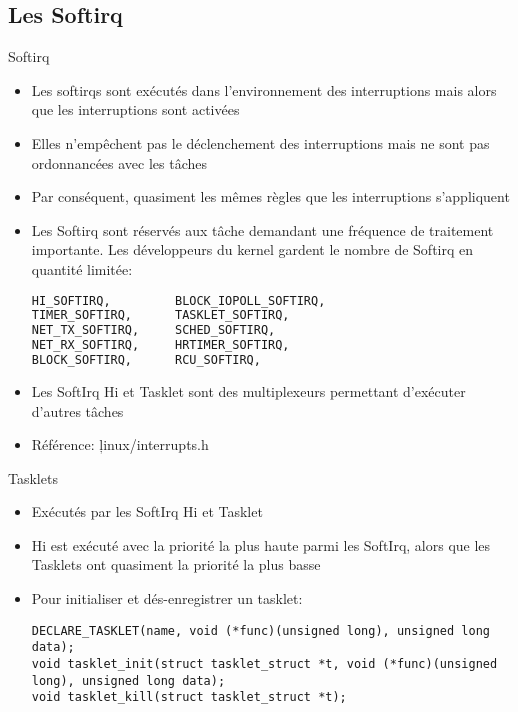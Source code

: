 \subsection{Les Softirq}

\begin{frame}[fragile=singleslide]{Softirq}
  \begin{itemize}
  \item   Les  softirqs   sont  exécutés   dans   l'environnement  des
    interruptions mais alors que les interruptions sont activées
  \item Elles  n'empêchent pas le déclenchement  des interruptions mais
    ne sont pas ordonnancées avec les tâches
  \item   Par  conséquent,   quasiment  les   mêmes  règles   que  les
    interruptions s'appliquent
  \item Les Softirq sont réservés aux tâche demandant une fréquence de
    traitement  importante.  Les  développeurs  du kernel  gardent  le
    nombre de Softirq en quantité limitée:
    \begin{lstlisting}[language=sh]
HI_SOFTIRQ,         BLOCK_IOPOLL_SOFTIRQ,
TIMER_SOFTIRQ,      TASKLET_SOFTIRQ,
NET_TX_SOFTIRQ,     SCHED_SOFTIRQ,
NET_RX_SOFTIRQ,     HRTIMER_SOFTIRQ,
BLOCK_SOFTIRQ,      RCU_SOFTIRQ,
    \end{lstlisting}
  \item Les SoftIrq Hi et Tasklet sont des multiplexeurs permettant
    d'exécuter d'autres tâches
  \item Référence: \c{linux/interrupts.h}
  \end{itemize}
\end{frame}

\begin{frame}[fragile=singleslide]{Tasklets}
  \begin{itemize}
  \item Exécutés par les SoftIrq Hi et Tasklet
  \item  Hi est  exécuté  avec la  priorité  la plus  haute parmi  les
    SoftIrq, alors que les Tasklets ont quasiment la priorité la plus
    basse
  \item Pour initialiser et dés-enregistrer un tasklet:
    \begin{lstlisting}
DECLARE_TASKLET(name, void (*func)(unsigned long), unsigned long data);
void tasklet_init(struct tasklet_struct *t, void (*func)(unsigned long), unsigned long data);
void tasklet_kill(struct tasklet_struct *t);
    \end{lstlisting}
  \end{itemize}
\end{frame}

